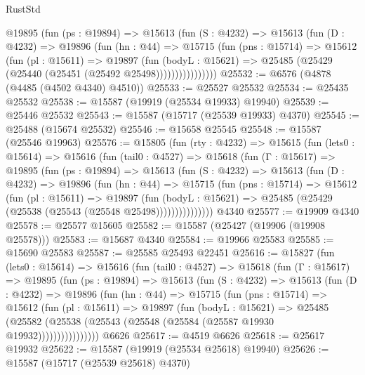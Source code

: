 \begin{lexlean}{RustStd}
\begin{coremodule}
            @19895
              (fun (ps : @19894) =>
              @15613
                (fun (S : @4232) =>
                @15613
                  (fun (D : @4232) =>
                  @19896
                    (fun (hn : @44) =>
                    @15715
                      (fun (pns : @15714) =>
                      @15612
                        (fun (pl : @15611) =>
                        @19897
                          (fun (bodyL : @15621) =>
                          @25485 (@25429 (@25440 (@25451 (@25492 @25498))))))))))))))))
@25532 := @6576 (@4878 (@4485 (@4502 @4340) @4510))
@25533 := @25527 @25532
@25534 := @25435 @25532
@25538 := @15587 (@19919 (@25534 @19933) @19940)
@25539 := @25446 @25532
@25543 := @15587 (@15717 (@25539 @19933) @4370)
@25545 := @25488 (@15674 @25532)
@25546 := @15658 @25545
@25548 := @15587 (@25546 @19963)
@25576 := @15805
    (fun (rty : @4232) =>
    @15615
      (fun (lets0 : @15614) =>
      @15616
        (fun (tail0 : @4527) =>
        @15618
          (fun (Γ : @15617) =>
          @19895
            (fun (ps : @19894) =>
            @15613
              (fun (S : @4232) =>
              @15613
                (fun (D : @4232) =>
                @19896
                  (fun (hn : @44) =>
                  @15715
                    (fun (pns : @15714) =>
                    @15612
                      (fun (pl : @15611) =>
                      @19897
                        (fun (bodyL : @15621) =>
                        @25485 (@25429 (@25538 (@25543 (@25548 @25498)))))))))))))))
    @4340
@25577 := @19909 @4340
@25578 := @25577 @15605
@25582 := @15587 (@25427 (@19906 (@19908 @25578)))
@25583 := @15687 @4340
@25584 := @19966 @25583
@25585 := @15690 @25583
@25587 := @25585 @25493 @22451
@25616 := @15827
    (fun (lets0 : @15614) =>
    @15616
      (fun (tail0 : @4527) =>
      @15618
        (fun (Γ : @15617) =>
        @19895
          (fun (ps : @19894) =>
          @15613
            (fun (S : @4232) =>
            @15613
              (fun (D : @4232) =>
              @19896
                (fun (hn : @44) =>
                @15715
                  (fun (pns : @15714) =>
                  @15612
                    (fun (pl : @15611) =>
                    @19897
                      (fun (bodyL : @15621) =>
                      @25485
                        (@25582
                          (@25538 (@25543 (@25548 (@25584 (@25587 @19930 @19932))))))))))))))))
    @6626
@25617 := @4519 @6626
@25618 := @25617 @19932
@25622 := @15587 (@19919 (@25534 @25618) @19940)
@25626 := @15587 (@15717 (@25539 @25618) @4370)

\end{coremodule}
\end{lexlean}
